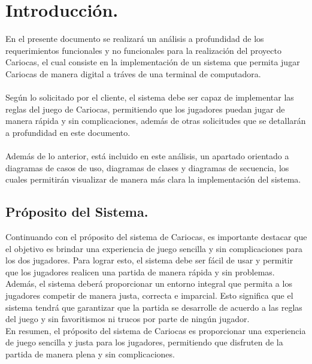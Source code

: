 
\section{Introducción.}\label{cap:intro}
En el presente documento se realizará un análisis a profundidad de los requerimientos funcionales y no funcionales para la realización del proyecto
Cariocas, el cual consiste en la implementación de un sistema que permita jugar Cariocas de manera digital a tráves de una terminal de computadora.\\
\\Según lo solicitado por el cliente, el sistema debe ser capaz de implementar las reglas del juego de Cariocas,
permitiendo que los jugadores puedan jugar de manera rápida y sin complicaciones, además de otras solicitudes 
que se detallarán a profundidad en este documento.\\
\\Además de lo anterior, está incluido en este análisis, un apartado orientado a diagramas de casos de uso,
diagramas de clases y diagramas de secuencia, los cuales permitirán visualizar de manera más clara la implementación del sistema.\\



\subsection{Próposito del Sistema.}\label{cap:proposito}
Continuando con el próposito del sistema de Cariocas, es importante destacar que el objetivo es 
brindar una experiencia de juego sencilla y sin complicaciones para los dos jugadores. Para lograr esto, 
el sistema debe ser fácil de usar y permitir que los jugadores realicen una partida de manera rápida y sin problemas.\\

Además, el sistema deberá proporcionar un entorno integral que permita a los jugadores competir de manera justa, 
correcta e imparcial. Esto significa que el sistema tendrá que garantizar que la partida se desarrolle de acuerdo a las reglas del juego y sin 
favoritismos ni trucos por parte de ningún jugador.\\

En resumen, el próposito del sistema de Cariocas es proporcionar una experiencia de juego sencilla y justa para los 
jugadores, permitiendo que disfruten de la partida de manera plena y sin complicaciones.



